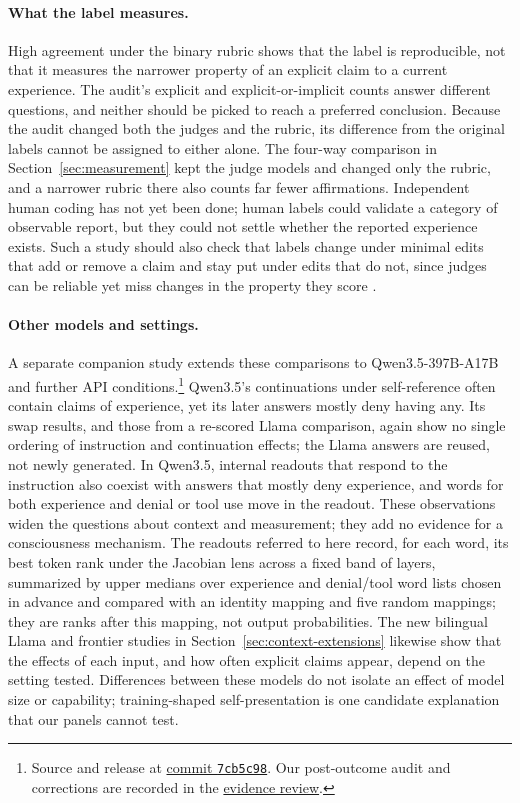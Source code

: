 \documentclass[11pt]{article}
\newcommand{\mainartifact}[2]{\href{https://github.com/tdj28/llm_selfref_pre/blob/99078186076d1c2bd0e3f0ac909f96d78d7cda03/#1}{#2}}
\begin{document}
\paragraph{What the label measures.}
High agreement under the binary rubric shows that the label is reproducible,
not that it measures the narrower property of an explicit claim to a current
experience. The audit's
explicit and explicit-or-implicit counts answer different questions, and
neither should be picked to reach a preferred conclusion. Because the audit
changed both the judges and the rubric, its difference from the original
labels cannot be assigned to either alone. The four-way comparison in
Section~\ref{sec:measurement} kept the judge models and changed only the
rubric, and a narrower rubric there also counts far fewer affirmations.
Independent human coding has not
yet been done; human labels could validate a category of observable report,
but they could not settle whether the reported experience exists. Such a
study should also check that labels change under minimal edits that add or
remove a claim and stay put under edits that do not, since judges can be
reliable yet miss changes in the property they score
\citep{chen2026judgeconstruct}.

\paragraph{Other models and settings.}
A separate companion study extends these comparisons to Qwen3.5-397B-A17B
and further API conditions.\footnote{Source and release at
\href{https://github.com/tdj28/selfref_scaling/tree/7cb5c984eb41968b6f3d2f9b322f4de125a1d1ca}{commit \texttt{7cb5c98}}.
Our post-outcome audit and corrections are recorded in
the \mainartifact{docs/SELFREF_SCALING_EVIDENCE_REVIEW_20261003.md}{evidence review}.}
Qwen3.5's continuations under self-reference often contain claims of
experience, yet its later answers mostly deny having any. Its swap results,
and those from a re-scored Llama comparison, again show no single ordering of
instruction and continuation effects; the Llama answers are reused, not newly
generated. In Qwen3.5, internal readouts that respond to the instruction also
coexist with answers that mostly deny experience, and words for both
experience and denial or tool use move in the readout. These observations
widen the questions about context and measurement; they add no evidence for a
consciousness mechanism. The readouts referred to here record, for each word,
its best token rank under the Jacobian lens across a fixed band of layers,
summarized by upper medians over experience and denial/tool word lists chosen
in advance and compared with an identity mapping and five random mappings;
they are ranks after this mapping, not output probabilities. The new
bilingual Llama and frontier studies in Section~\ref{sec:context-extensions}
likewise show that the effects of each input, and how often explicit claims
appear, depend on the setting tested. Differences between these models do not
isolate an effect of model size or capability; training-shaped
self-presentation \citep{plisiecki2026twoprocess} is one candidate explanation
that our panels cannot test.
\end{document}
